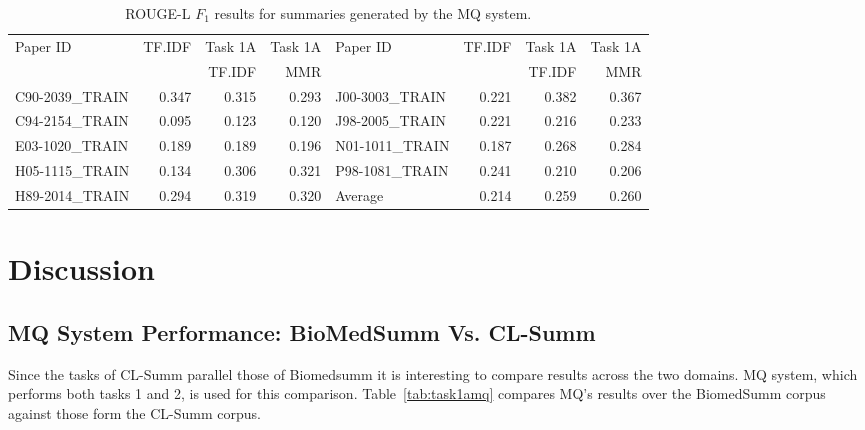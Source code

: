 \documentclass[11pt]{article}
\begin{document}
\begin{table*}
  \centering
  \begin{tabular}{|l|r|r|r||l|r|r|r|}
  \hline
	Paper ID & TF.IDF & Task 1A  & Task 1A & 	Paper ID & TF.IDF & Task 1A  & Task 1A  \\
			&	& TF.IDF & MMR & 	&	& TF.IDF & MMR \\
	\hline
	C90-2039\_TRAIN & 0.347 & 0.315 & 0.293 &	J00-3003\_TRAIN & 0.221 & 0.382 & 0.367\\
	C94-2154\_TRAIN & 0.095 & 0.123 & 0.120 & 	J98-2005\_TRAIN & 0.221 & 0.216 & 0.233\\
	E03-1020\_TRAIN & 0.189 & 0.189 & 0.196 &	N01-1011\_TRAIN & 0.187 & 0.268 & 0.284\\
	H05-1115\_TRAIN & 0.134 & 0.306 & 0.321 & 	P98-1081\_TRAIN & 0.241 & 0.210 & 0.206\\
\cline{5-8}
	H89-2014\_TRAIN & 0.294 & 0.319 & 0.320 &	Average & 0.214 & 0.259 & 0.260 \\
	\hline
  \end{tabular}
  \caption{ROUGE-L $F_1$ results for summaries generated by the MQ system.}
  \label{tab:task2v2}
\end{table*}




\section{Discussion}
\vspace{-.3cm}
\subsection{MQ System Performance: BioMedSumm Vs. CL-Summ}


Since the tasks of CL-Summ parallel those of Biomedsumm
it is interesting to compare results across the two domains. MQ
system, which performs both tasks 1 and 2, is used for this comparison.
Table~\ref{tab:task1amq} compares MQ's results over the BiomedSumm corpus
against those form the CL-Summ corpus.
\end{document}
